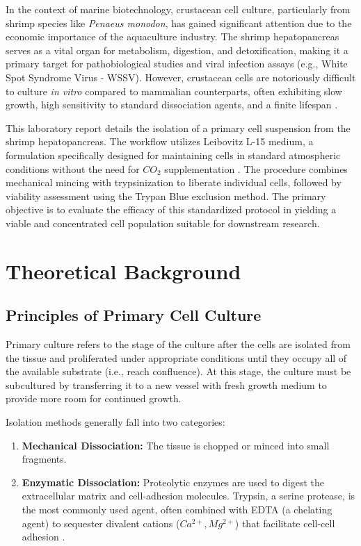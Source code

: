 \documentclass[a4paper]{article}
\begin{document}
In the context of marine biotechnology, crustacean cell culture, particularly from shrimp species like \textit{Penaeus monodon}, has gained significant attention due to the economic importance of the aquaculture industry. The shrimp hepatopancreas serves as a vital organ for metabolism, digestion, and detoxification, making it a primary target for pathobiological studies and viral infection assays (e.g., White Spot Syndrome Virus - WSSV). However, crustacean cells are notoriously difficult to culture \textit{in vitro} compared to mammalian counterparts, often exhibiting slow growth, high sensitivity to standard dissociation agents, and a finite lifespan \cite{1, 6}.

This laboratory report details the isolation of a primary cell suspension from the shrimp hepatopancreas. The workflow utilizes Leibovitz L-15 medium, a formulation specifically designed for maintaining cells in standard atmospheric conditions without the need for $CO_2$ supplementation \cite{2}. The procedure combines mechanical mincing with trypsinization to liberate individual cells, followed by viability assessment using the Trypan Blue exclusion method. The primary objective is to evaluate the efficacy of this standardized protocol in yielding a viable and concentrated cell population suitable for downstream research.

\section{Theoretical Background}
\subsection{Principles of Primary Cell Culture}
Primary culture refers to the stage of the culture after the cells are isolated from the tissue and proliferated under appropriate conditions until they occupy all of the available substrate (i.e., reach confluence). At this stage, the culture must be subcultured by transferring it to a new vessel with fresh growth medium to provide more room for continued growth.

Isolation methods generally fall into two categories:
\begin{enumerate}
    \item \textbf{Mechanical Dissociation:} The tissue is chopped or minced into small fragments.
    \item \textbf{Enzymatic Dissociation:} Proteolytic enzymes are used to digest the extracellular matrix and cell-adhesion molecules. Trypsin, a serine protease, is the most commonly used agent, often combined with EDTA (a chelating agent) to sequester divalent cations ($Ca^{2+}, Mg^{2+}$) that facilitate cell-cell adhesion \cite{3}.
\end{enumerate}
\end{document}

